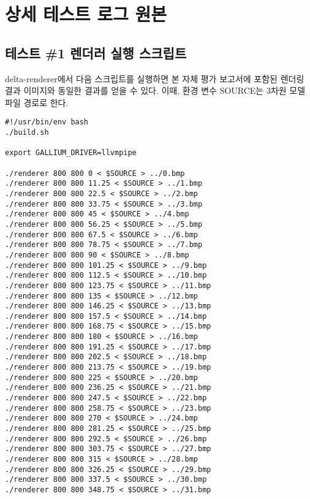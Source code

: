 \chapter{상세 테스트 로그 원본}

\section{테스트 \#1 렌더러 실행 스크립트}
delta-renderer에서 다음 스크립트를 실행하면 본 자체 평가 보고서에 포함된 렌더링 결과 이미지와 동일한 결과를 얻을 수 있다.
이때, 환경 변수 SOURCE는 3차원 모델 파일 경로로 한다.

\begin{Verbatim}[fontsize=\tiny, breaklines=true, breakanywhere=true]
#!/usr/bin/env bash
./build.sh

export GALLIUM_DRIVER=llvmpipe

./renderer 800 800 0 < $SOURCE > ../0.bmp
./renderer 800 800 11.25 < $SOURCE > ../1.bmp
./renderer 800 800 22.5 < $SOURCE > ../2.bmp
./renderer 800 800 33.75 < $SOURCE > ../3.bmp
./renderer 800 800 45 < $SOURCE > ../4.bmp
./renderer 800 800 56.25 < $SOURCE > ../5.bmp
./renderer 800 800 67.5 < $SOURCE > ../6.bmp
./renderer 800 800 78.75 < $SOURCE > ../7.bmp
./renderer 800 800 90 < $SOURCE > ../8.bmp
./renderer 800 800 101.25 < $SOURCE > ../9.bmp
./renderer 800 800 112.5 < $SOURCE > ../10.bmp
./renderer 800 800 123.75 < $SOURCE > ../11.bmp
./renderer 800 800 135 < $SOURCE > ../12.bmp
./renderer 800 800 146.25 < $SOURCE > ../13.bmp
./renderer 800 800 157.5 < $SOURCE > ../14.bmp
./renderer 800 800 168.75 < $SOURCE > ../15.bmp
./renderer 800 800 180 < $SOURCE > ../16.bmp
./renderer 800 800 191.25 < $SOURCE > ../17.bmp
./renderer 800 800 202.5 < $SOURCE > ../18.bmp
./renderer 800 800 213.75 < $SOURCE > ../19.bmp
./renderer 800 800 225 < $SOURCE > ../20.bmp
./renderer 800 800 236.25 < $SOURCE > ../21.bmp
./renderer 800 800 247.5 < $SOURCE > ../22.bmp
./renderer 800 800 258.75 < $SOURCE > ../23.bmp
./renderer 800 800 270 < $SOURCE > ../24.bmp
./renderer 800 800 281.25 < $SOURCE > ../25.bmp
./renderer 800 800 292.5 < $SOURCE > ../26.bmp
./renderer 800 800 303.75 < $SOURCE > ../27.bmp
./renderer 800 800 315 < $SOURCE > ../28.bmp
./renderer 800 800 326.25 < $SOURCE > ../29.bmp
./renderer 800 800 337.5 < $SOURCE > ../30.bmp
./renderer 800 800 348.75 < $SOURCE > ../31.bmp
\end{Verbatim}

